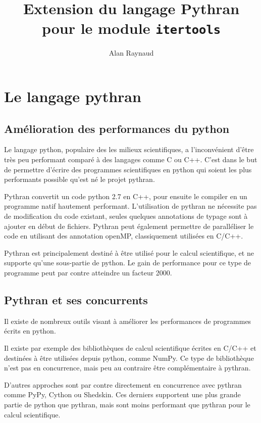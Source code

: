 \documentclass[a4paper]{article}
\title{Extension du langage Pythran pour le module \texttt{itertools}}
\author{Alan Raynaud}
\date{}
\begin{document}

\maketitle   


\clearpage

\section*{Le langage pythran}

\subsection*{Amélioration des performances du python}

Le langage python, populaire des les milieux scientifiques, a
l'inconvénient d'être très peu performant comparé à des langages comme
C ou C++. C'est dans le but de permettre d'écrire des programmes
scientifiques en python qui soient les plus performants possible
qu'est né le projet pythran.

Pythran convertit un code python 2.7 en C++, pour ensuite le compiler
en un programme natif hautement performant. L'utilisation de pythran
ne nécessite pas de modification du code existant, seules quelques
annotations de typage sont à ajouter en début de fichiers. Pythran
peut également permettre de paralléliser le code en utilisant des
annotation openMP, classiquement utilisées en C/C++.

Pythran est principalement destiné à être utilisé pour le calcul
scientifique, et ne supporte qu'une sous-partie de python. Le gain de
performance pour ce type de programme peut par contre atteindre un
facteur 2000.

\subsection*{Pythran et ses concurrents}

Il existe de nombreux outils visant à améliorer les performances de
programmes écrits en python.

Il existe par exemple des bibliothèques de calcul scientifique écrites
en C/C++ et destinées à être utilisées depuis python, comme NumPy. Ce
type de bibliothèque n'est pas en concurrence, mais peu au contraire
être complémentaire à pythran.

D'autres approches sont par contre directement en concurrence avec
pythran comme PyPy, Cython ou Shedskin. Ces derniers supportent une
plus grande partie de python que pythran, mais sont moins performant
que pythran pour le calcul scientifique.
\end{document}
